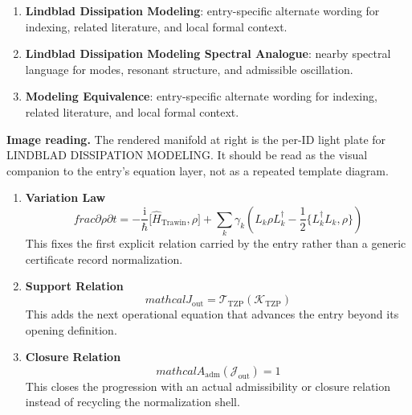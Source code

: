 \begin{enumerate}[leftmargin=1.6em,itemsep=6pt,topsep=4pt]
\item \textbf{Lindblad Dissipation Modeling}: entry-specific alternate wording for indexing, related literature, and local formal context.
\item \textbf{Lindblad Dissipation Modeling Spectral Analogue}: nearby spectral language for modes, resonant structure, and admissible oscillation.
\item \textbf{Modeling Equivalence}: entry-specific alternate wording for indexing, related literature, and local formal context.
\end{enumerate}

\begin{samepage}
\noindent\begin{minipage}[t]{0.45\linewidth}
\vspace{0pt}
\raggedright
\scriptsize\textbf{Image reading.} The rendered manifold at right is the per-ID light plate for LINDBLAD DISSIPATION MODELING. It should be read as the visual companion to the entry's equation layer, not as a repeated template diagram.\par
\end{minipage}\hfill
\begin{minipage}[t]{0.53\linewidth}
\vspace*{-0.10in}
\raggedright
{}
\end{minipage}
\end{samepage}

\clearpage


\begin{enumerate}[leftmargin=1.6em,itemsep=9pt,topsep=6pt]
\item \textbf{Variation Law}
\[
frac{\partial \rho}{\partial t} = - \frac{\mathrm{i}}{\hbar} \bigl[ \widehat{H}_{\mathrm{Trawin}}, \rho \bigr] + \sum_{k} \gamma_{k} \left( L_{k} \rho L_{k}^{\dagger} - \frac{1}{2} \bigl\{ L_{k}^{\dagger} L_{k}, \rho \bigr\} \right)
\]
This fixes the first explicit relation carried by the entry rather than a generic certificate record normalization.

\item \textbf{Support Relation}
\[
mathcal{J}_{\mathrm{out}} = \mathcal{T}_{\mathrm{TZP}}\!\left(\mathcal{K}_{\mathrm{TZP}}\right)
\]
This adds the next operational equation that advances the entry beyond its opening definition.

\item \textbf{Closure Relation}
\[
mathcal{A}_{\mathrm{adm}}\!\left(\mathcal{J}_{\mathrm{out}}\right)=1
\]
This closes the progression with an actual admissibility or closure relation instead of recycling the normalization shell.
\end{enumerate}

